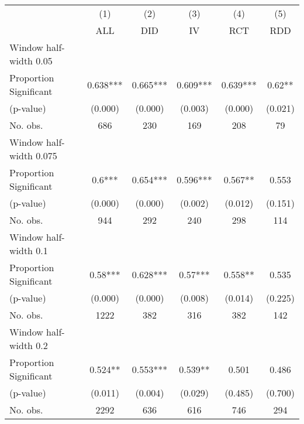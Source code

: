 
\def\sym#1{\ifmmode^{#1}\else\(^{#1}\)\fi}
\begin{tabular}{l*{5}{c}}
\hline\hline
& \multicolumn{1}{c}{(1)} &  \multicolumn{1}{c}{(2)} &  \multicolumn{1}{c}{(3)} &  \multicolumn{1}{c}{(4)} &  \multicolumn{1}{c}{(5)}\\
& \multicolumn{1}{c}{ALL} &  \multicolumn{1}{c}{DID} &  \multicolumn{1}{c}{IV} &  \multicolumn{1}{c}{RCT} &  \multicolumn{1}{c}{RDD}\\

\hline
\hline
Window half-width 0.05\\

Proportion Significant& 0.638*** &  0.665*** &  0.609*** &  0.639*** &  0.62**\\

(p-value) & (0.000) &  (0.000) &  (0.003) &  (0.000) &  (0.021)\\

No. obs.& 686 &  230 &  169 &  208 &  79\\

\hline
Window half-width 0.075\\

Proportion Significant& 0.6*** &  0.654*** &  0.596*** &  0.567** &  0.553\\

(p-value) & (0.000) &  (0.000) &  (0.002) &  (0.012) &  (0.151)\\

No. obs.& 944 &  292 &  240 &  298 &  114\\

\hline
Window half-width 0.1\\

Proportion Significant& 0.58*** &  0.628*** &  0.57*** &  0.558** &  0.535\\

(p-value) & (0.000) &  (0.000) &  (0.008) &  (0.014) &  (0.225)\\

No. obs.& 1222 &  382 &  316 &  382 &  142\\

\hline
Window half-width 0.2\\

Proportion Significant& 0.524** &  0.553*** &  0.539** &  0.501 &  0.486\\

(p-value) & (0.011) &  (0.004) &  (0.029) &  (0.485) &  (0.700)\\

No. obs.& 2292 &  636 &  616 &  746 &  294\\


\end{tabular}
